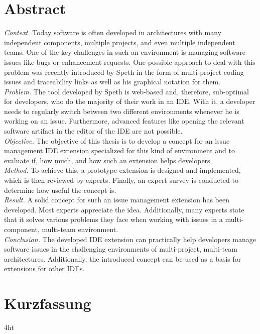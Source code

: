 \documentclass[
  a4paper,  %
  twoside,  %
  bibliography=totoc,
  headsepline,
  cleardoublepage=empty,
  parskip=half,
  draft=false
]{scrbook}
\begin{document}
\section*{Abstract}
\textit{Context.} Today software is often developed in architectures with many independent components, multiple projects, and even multiple independent teams. 
One of the key challenges in such an environment is managing software issues like bugs or enhancement requests. 
One possible approach to deal with this problem was recently introduced by Speth in the form of multi-project coding issues and traceability links
as well as his graphical notation for them. \\
\textit{Problem.} The tool developed by Speth is web-based and, therefore, sub-optimal for developers, 
who do the majority of their work in an \gls{IDE}. 
With it, a developer needs to regularly switch between two different environments whenever he is working on an issue. 
Furthermore, advanced features like opening the relevant software artifact in the editor of the \gls{IDE} are not possible. \\
\textit{Objective.} The objective of this thesis is to develop a concept for an issue management \gls{IDE} extension specialized for this kind of environment and to evaluate if, how much, and how such an extension helps developers. \\
\textit{Method.} To achieve this, a prototype extension is designed and implemented, which is then reviewed by experts.
Finally, an expert survey is conducted to determine how useful the concept is.\\
\textit{Result.} A solid concept for such an issue management extension has been developed. 
Most experts appreciate the idea. Additionally, many experts state that it solves various problems they face when working with issues in a multi-component, multi-team environment.\\
\textit{Conclusion.} The developed \gls{IDE} extension can practically help developers manage software issues in the challenging environments of multi-project, multi-team architectures. Additionally, the introduced concept can be used as a basis for extensions for other \glspl{IDE}.
\cleardoublepage

\section*{Kurzfassung}
\lipsum[2-2]
\cleardoublepage

\iftex4ht
\else
\fi
\end{document}
